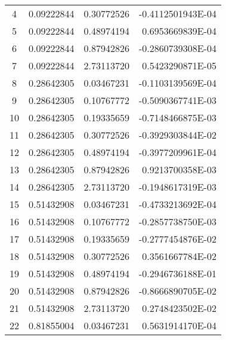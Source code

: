 \begin{longtable}{@{\extracolsep{\fill}}cllr@{}}
4  &  0.09222844  &  0.30772526  &  -0.4112501943E-04 \\

5  &  0.09222844  &  0.48974194  &   0.6953669839E-04 \\

6  &  0.09222844  &  0.87942826  &  -0.2860739308E-04 \\

7  &  0.09222844  &  2.73113720  &   0.5423290871E-05 \\

8  &  0.28642305  &  0.03467231  &  -0.1103139569E-04 \\

9  &  0.28642305  &  0.10767772  &  -0.5090367741E-03 \\

10  &  0.28642305  &  0.19335659  &  -0.7148466875E-03 \\

11  &  0.28642305  &  0.30772526  &  -0.3929303844E-02 \\

12  &  0.28642305  &  0.48974194  &  -0.3977209961E-04 \\

13  &  0.28642305  &  0.87942826  &   0.9213700358E-03 \\

14  &  0.28642305  &  2.73113720  &  -0.1948617319E-03 \\

15  &  0.51432908  &  0.03467231  &  -0.4733213692E-04 \\

16  &  0.51432908  &  0.10767772  &  -0.2857738750E-03 \\

17  &  0.51432908  &  0.19335659  &  -0.2777454876E-02 \\

18  &  0.51432908  &  0.30772526  &   0.3561667784E-02 \\

19  &  0.51432908  &  0.48974194  &  -0.2946736188E-01 \\

20  &  0.51432908  &  0.87942826  &  -0.8666890705E-02 \\

21  &  0.51432908  &  2.73113720  &   0.2748423502E-02 \\

22  &  0.81855004  &  0.03467231  &   0.5631914170E-04 \\


\end{longtable}
